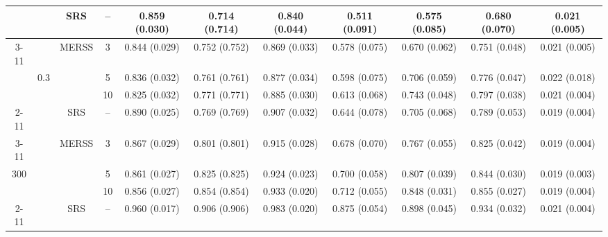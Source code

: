 \documentclass[twoside]{article}
\begin{document}
\begin{table}[!htb]
{\begin{tabular}{c c c c c c c c c c c}
  \bottomrule 
    
    \multirow{27}{*}{} & 
    \multirow{9}{*}{ }  & 
    \multirow{1}{*}{SRS} & -- 
 &0.859 (0.030) & 0.714 (0.714) & 0.840 (0.044) & 0.511 (0.091) & 0.575 (0.085) & 0.680 (0.070)& 0.021 (0.005)  \\
   
    \cmidrule(lr){3-11}
    &                      & \multirow{3}{*}{MERSS}   &  3   & 
    0.844 (0.029) & 0.752 (0.752) & 0.869 (0.033) & 0.578 (0.075) & 0.670 (0.062) & 0.751 (0.048)& 0.021 (0.005)  \\

    &         0.3             &                                          &  5    &
    0.836 (0.032) & 0.761 (0.761) & 0.877 (0.034) & 0.598 (0.075) & 0.706 (0.059) & 0.776 (0.047)& 0.022 (0.018)  \\

    &                      &                                          &  10   &
  0.825 (0.032) & 0.771 (0.771) & 0.885 (0.030) & 0.613 (0.068) & 0.743 (0.048) & 0.797 (0.038)& 0.021 (0.004)  \\


    
 \cmidrule(lr){2-11}
  &\multirow{9}{*}{ }  & 
   \multirow{1}{*}{SRS} & -- 
 &0.890 (0.025) & 0.769 (0.769) & 0.907 (0.032) & 0.644 (0.078) & 0.705 (0.068) & 0.789 (0.053)& 0.019 (0.004)  \\
    
    \cmidrule(lr){3-11}
    &                      & \multirow{3}{*}{MERSS}   &  3   & 
  0.867 (0.029) & 0.801 (0.801) & 0.915 (0.028) & 0.678 (0.070) & 0.767 (0.055) & 0.825 (0.042)& 0.019 (0.004)  \\

  300 &          0.5            &                                          &  5    &
   0.861 (0.027) & 0.825 (0.825) & 0.924 (0.023) & 0.700 (0.058) & 0.807 (0.039) & 0.844 (0.030)& 0.019 (0.003)  \\

    &                      &                                          &  10   &
   0.856 (0.027) & 0.854 (0.854) & 0.933 (0.020) & 0.712 (0.055) & 0.848 (0.031) & 0.855 (0.027)& 0.019 (0.004)  \\

  

    \cmidrule(lr){2-11}
 &\multirow{9}{*}{ }  & 
    \multirow{1}{*}{SRS} & -- 
 &0.960 (0.017) & 0.906 (0.906) & 0.983 (0.020) & 0.875 (0.054) & 0.898 (0.045) & 0.934 (0.032)& 0.021 (0.004)  \\
    

\end{tabular}}
\end{table}
\end{document}
